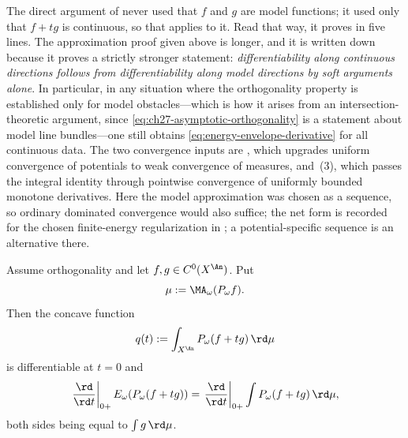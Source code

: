 \begin{remark}
\label{rem:ch27-two-proofs}
The direct argument of
 never used that $f$ and
$g$ are model functions; it used only that $f+tg$ is continuous, so that
 applies to it.  Read that way, it proves
 in five lines.  The
approximation proof given above is longer, and it is written down because it
proves a strictly stronger statement: \emph{differentiability along
continuous directions follows from differentiability along model directions
by soft arguments alone}.  In particular, in any situation where the
orthogonality property is established only for model obstacles---which is
how it arises from an intersection-theoretic argument, since
\eqref{eq:ch27-asymptotic-orthogonality} is a statement about model line
bundles---one still obtains
\eqref{eq:energy-envelope-derivative} for all continuous data.  The two
convergence inputs are , which upgrades uniform
convergence of potentials to weak convergence of measures, and
\,(3), which passes the integral identity through
pointwise convergence of uniformly bounded monotone derivatives.  Here the
model approximation was chosen as a sequence, so ordinary dominated
convergence would also suffice; the net form is recorded for the chosen finite-energy regularization in
; a potential-specific sequence is an
alternative there.
\end{remark}

\begin{corollary}
\label{cor:ch27-linearization}
Assume orthogonality and let $f,g\in C^0(X^{\An})$.  Put
\[
 \mu:=\MA_\omega(P_\omega f).
\]
Then the concave function
\[
 q(t):=\int_{X^{\An}}P_\omega(f+tg)\,\rd\mu
\]
is differentiable at $t=0$ and
\begin{equation}\label{eq:linearized-envelope-energy}
 \left.\frac{\rd}{\rd t}\right|_{0+}E_\omega(P_\omega(f+tg))
 =
 \left.\frac{\rd}{\rd t}\right|_{0+}
 \int P_\omega(f+tg)\,\rd \mu ,
\end{equation}
both sides being equal to $\int g\,\rd\mu$.
\end{corollary}

